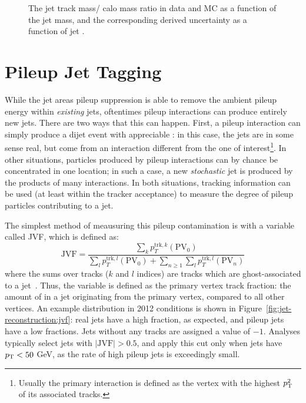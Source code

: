 
\begin{figure}
\centering
{}
\caption{The jet track mass/ calo mass ratio in data and MC as a function of the jet mass, and the corresponding derived uncertainty as a function of jet \pt.}
\label{fig:jet-reconstruction:jms_uncertainty}
\end{figure}


\section{Pileup Jet Tagging}
\label{jet-reconstruction:pileup-jet-tagging}

While the jet areas pileup suppression is able to remove the ambient pileup energy within \textit{existing} jets, oftentimes pileup interactions can produce entirely new jets. There are two ways that this can happen. First, a pileup interaction can simply produce a dijet event with appreciable \pt: in this case, the jets are in some sense real, but come from an interaction different from the one of interest\footnote{Usually the primary interaction is defined as the vertex with the highest $p_{\text{T}}^2$ of its associated tracks.}. In other situations, particles produced by pileup interactions can by chance be concentrated in one location; in such a case, a new \textit{stochastic} jet is produced by the products of many interactions. In both situations, tracking information can be used (at least within the tracker acceptance) to measure the degree of pileup particles contributing to a jet.

The simplest method of meausuring this pileup contamination is with a variable called JVF, which is defined as:
%
\begin{equation}
\label{eqn:jet-reconstruction:jvf}
\mathrm{JVF} = \frac{\sum_k p_T^{\mathrm{trk},k}(\mathrm{PV}_0)}{ \sum_l p_T^{\mathrm{trk},l}(\mathrm{PV}_0) + \sum_{n\geq1} \sum_l p_T^{\mathrm{trk},l}(\mathrm{PV}_n)}
\end{equation}
%
where the sums over tracks ($k$ and $l$ indices) are tracks which are ghost-associated to a jet~\cite{ATLAS-JVF}. Thus, the variable is defined as the primary vertex track \pt fraction: the amount of \pt in a jet originating from the primary vertex, compared to all other vertices. An example distribution in 2012 conditions is shown in Figure~\ref{fig:jet-reconstruction:jvf}: real jets have a high fraction, as expected, and pileup jets have a low fractions. Jets without any tracks are assigned a value of $-1$. Analyses typically select jets with $|\mathrm{JVF}| > 0.5$, and apply this cut only when jets have $p_{\text{T}} < 50$ GeV, as the rate of high \pt pileup jets is exceedingly small. 

